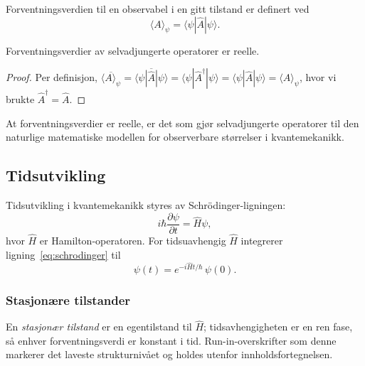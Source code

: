 \documentclass[a4paper,11pt]{article}
\begin{document}
Forventningsverdien til en observabel i en gitt tilstand er
definert ved
\begin{equation}
  \langle A \rangle_\psi
  = \langle \psi | \hat{A} | \psi \rangle .
  \label{eq:forventning}
\end{equation}

\begin{hovedresultat}
\begin{teorem}
  Forventningsverdier av selvadjungerte operatorer er reelle.
\end{teorem}
\end{hovedresultat}

\begin{proof}
  Per definisjon,
  $\overline{\langle A \rangle_\psi}
  = \overline{\langle \psi | \hat{A} | \psi \rangle}
  = \langle \psi | \hat{A}^\dagger | \psi \rangle
  = \langle \psi | \hat{A} | \psi \rangle
  = \langle A \rangle_\psi$,
  hvor vi brukte $\hat{A}^\dagger = \hat{A}$.
\end{proof}

\begin{merknad}
  At forventningsverdier er reelle, er det som gjør
  selvadjungerte operatorer til den naturlige matematiske
  modellen for observerbare størrelser i kvantemekanikk.
\end{merknad}

\subsection{Tidsutvikling}

Tidsutvikling i kvantemekanikk styres av Schr\"odinger-ligningen:
\begin{equation}
  i\hbar \frac{\partial \psi}{\partial t}
  = \hat{H}\psi ,
  \label{eq:schrodinger}
\end{equation}
hvor $\hat{H}$ er Hamilton-operatoren. For tidsuavhengig
$\hat{H}$ integrerer ligning~\eqref{eq:schrodinger} til
\begin{equation}
  \psi(t) = e^{-i\hat{H}t/\hbar}\,\psi(0).
\end{equation}

\subsubsection{Stasjonære tilstander}
En \emph{stasjonær tilstand} er en egentilstand til $\hat{H}$;
tidsavhengigheten er en ren fase, så enhver forventningsverdi
er konstant i tid. Run-in-overskrifter som denne markerer det
laveste strukturnivået og holdes utenfor innholdsfortegnelsen.
\end{document}
